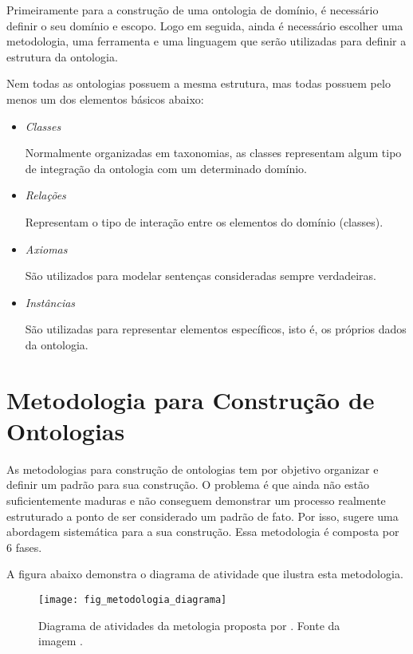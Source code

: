 Primeiramente para a construção de uma ontologia de domínio, é necessário definir
o seu domínio e escopo. Logo em seguida, ainda é necessário escolher uma
metodologia, uma ferramenta e uma linguagem que serão utilizadas para definir a
estrutura da ontologia.

Nem todas as ontologias possuem a mesma estrutura, mas todas possuem pelo menos
um dos elementos básicos abaixo:

\begin{itemize}
    \item \textit{Classes}

    Normalmente organizadas em taxonomias, as classes representam algum tipo de
    integração da ontologia com um determinado domínio.

    \item \textit{Relações}

    Representam o tipo de interação entre os elementos do domínio (classes).

    \item \textit{Axiomas}

    São utilizados para modelar sentenças consideradas sempre verdadeiras.

    \item \textit{Instâncias}

    São utilizadas para representar elementos específicos, isto é, os próprios
    dados da ontologia.
\end{itemize}

\section{Metodologia para Construção de Ontologias}
\label{sec:metodologias_para_construcao_de_ontologias}

As metodologias para construção de ontologias tem por objetivo organizar e definir
um padrão para sua construção. O problema é que ainda não estão suficientemente
maduras e não conseguem demonstrar um processo realmente estruturado a ponto de
ser considerado um padrão de fato. Por isso, \cite{guizzardidesenvolvimento}
sugere uma abordagem sistemática para a sua construção. Essa metodologia é
composta por 6 fases.

A figura abaixo demonstra o diagrama de atividade que ilustra esta metodologia.

\begin{figure}[!h]
  \centering
  \texttt{[image: fig\_metodologia\_diagrama]}
  \caption{Diagrama de atividades da metologia proposta por
    \cite{guizzardidesenvolvimento}. Fonte da imagem \cite{morais2007ontologias}.
  }
  \label{fig:diagrama_metodologia}
\end{figure}

